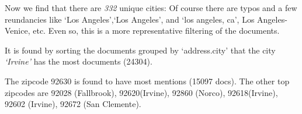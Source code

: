 \documentclass[]{article}
\newenvironment{Shaded}{\begin{snugshade}}{\end{snugshade}}
\newcommand{\DecValTok}[1]{\textcolor[rgb]{0.86,0.86,0.80}{{#1}}}
\newcommand{\StringTok}[1]{\textcolor[rgb]{0.80,0.58,0.58}{{#1}}}
\newcommand{\CommentTok}[1]{\textcolor[rgb]{0.50,0.62,0.50}{{#1}}}
\newcommand{\OtherTok}[1]{\textcolor[rgb]{0.94,0.94,0.56}{{#1}}}
\newcommand{\NormalTok}[1]{\textcolor[rgb]{0.80,0.80,0.80}{{#1}}}
\begin{document}
\begin{Shaded}
\end{Shaded}

Now we find that there are \emph{332} unique cities: Of course there are
typos and a few reundancies like `Los Angeles',`Los \textbar{}Angeles',
and `los angeles, ca', Los Angeles-Venice, etc. Even so, this is a more
representative filtering of the documents.

It is found by sorting the documents grouped by `address.city' that the
city \emph{`Irvine'} has the most documents (24304).

\begin{Shaded}
\end{Shaded}

The zipcode 92630 is found to have most mentions (15097 docs). The other
top zipcodes are 92028 (Fallbrook), 92620(Irvine), 92860 (Norco),
92618(Irvine), 92602 (Irvine), 92672 (San Clemente).
\end{document}
